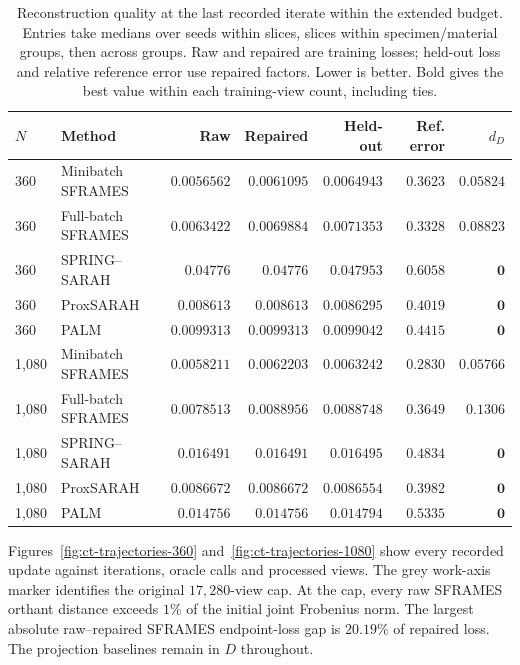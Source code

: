 \begin{table}[!htbp]
\centering
\caption{Reconstruction quality at the last recorded iterate within the extended budget. Entries take medians over seeds within slices, slices within specimen/material groups, then across groups. Raw and repaired are training losses; held-out loss and relative reference error use repaired factors. Lower is better. Bold gives the best value within each training-view count, including ties.}
\label{tab:ct-results}
\small
\setlength{\tabcolsep}{4pt}
\begin{tabular}{@{}llrrrrr@{}}
\toprule
$N$ & Method & Raw & Repaired & Held-out & Ref. error & $d_D$ \\
\midrule
360 & Minibatch SFRAMES & $\boldsymbol{0.0056562}$ & $\boldsymbol{0.0061095}$ & $\boldsymbol{0.0064943}$ & $0.3623$ & $0.05824$ \\
360 & Full-batch SFRAMES & $0.0063422$ & $0.0069884$ & $0.0071353$ & $\boldsymbol{0.3328}$ & $0.08823$ \\
360 & SPRING--SARAH & $0.04776$ & $0.04776$ & $0.047953$ & $0.6058$ & $\boldsymbol{0}$ \\
360 & ProxSARAH & $0.008613$ & $0.008613$ & $0.0086295$ & $0.4019$ & $\boldsymbol{0}$ \\
360 & PALM & $0.0099313$ & $0.0099313$ & $0.0099042$ & $0.4415$ & $\boldsymbol{0}$ \\
1{,}080 & Minibatch SFRAMES & $\boldsymbol{0.0058211}$ & $\boldsymbol{0.0062203}$ & $\boldsymbol{0.0063242}$ & $\boldsymbol{0.2830}$ & $0.05766$ \\
1{,}080 & Full-batch SFRAMES & $0.0078513$ & $0.0088956$ & $0.0088748$ & $0.3649$ & $0.1306$ \\
1{,}080 & SPRING--SARAH & $0.016491$ & $0.016491$ & $0.016495$ & $0.4834$ & $\boldsymbol{0}$ \\
1{,}080 & ProxSARAH & $0.0086672$ & $0.0086672$ & $0.0086554$ & $0.3982$ & $\boldsymbol{0}$ \\
1{,}080 & PALM & $0.014756$ & $0.014756$ & $0.014794$ & $0.5335$ & $\boldsymbol{0}$ \\
\bottomrule
\end{tabular}
\end{table}

Figures~\ref{fig:ct-trajectories-360} and~\ref{fig:ct-trajectories-1080}
show every recorded update against iterations, oracle calls and processed views.
The grey work-axis marker identifies the original \(17{,}280\)-view cap.
At the cap, every raw SFRAMES orthant distance exceeds \(1\%\) of the initial joint Frobenius norm. The largest absolute raw--repaired SFRAMES endpoint-loss gap is
\(20.19\%\) of repaired loss. The projection baselines remain in \(D\) throughout.

